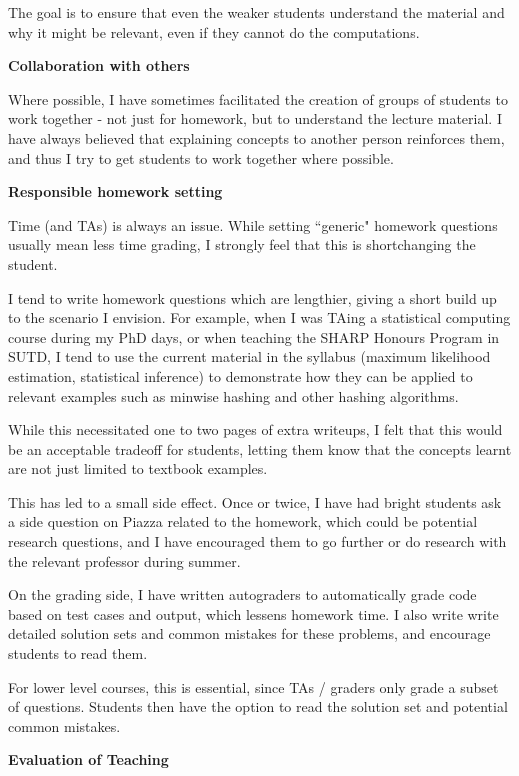 \documentclass[a4paper,12pt]{article}
\begin{document}
The goal is to ensure that even the weaker students understand the material and why it might be relevant, even if they cannot do the computations.



{\bf Collaboration with others}

Where possible, I have sometimes facilitated the creation of groups of students to work together - not just for homework, but to understand the lecture material. I have always believed that explaining concepts to another person reinforces them, and thus I try to get students to work together where possible.

{\bf Responsible homework setting}

Time (and TAs) is always an issue. While setting ``generic" homework questions usually mean less time grading, I strongly feel that this is shortchanging the student.

I tend to write homework questions which are lengthier, giving a short build up to the scenario I envision. For example, when I was TAing a statistical computing course during my PhD days, or when teaching the SHARP Honours Program in SUTD, I tend to use the current material in the syllabus (maximum likelihood estimation, statistical inference) to demonstrate how they can be applied to relevant examples such as minwise hashing and other hashing algorithms.

While this necessitated one to two pages of extra writeups, I felt that this would be an acceptable tradeoff for students, letting them know that the concepts learnt are not just limited to textbook examples.

This has led to a small side effect. Once or twice, I have had bright students ask a side question on Piazza related to the homework, which could be potential research questions, and I have encouraged them to go further or do research with the relevant professor during summer.

On the grading side, I have written autograders to automatically grade code based on test cases and output, which lessens homework time. I also write write detailed solution sets and common mistakes for these problems, and encourage students to read them.

For lower level courses, this is essential, since TAs / graders only grade a subset of questions. Students then have the option to read the solution set and potential common mistakes. 

{\bf Evaluation of Teaching}
\end{document}
